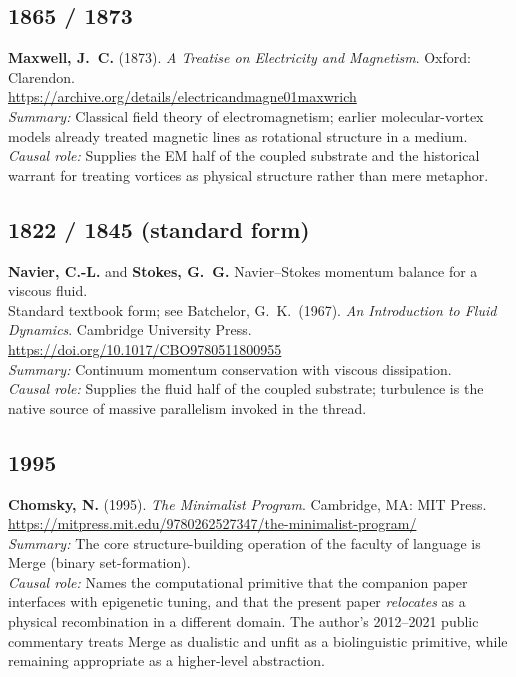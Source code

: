 \documentclass[11pt,a4paper]{article}
\begin{document}
\subsection*{1865 / 1873}
\textbf{Maxwell, J.~C.} (1873). \textit{A Treatise on Electricity and Magnetism}. Oxford: Clarendon.  \\
\url{https://archive.org/details/electricandmagne01maxwrich}\\
\textit{Summary:} Classical field theory of electromagnetism; earlier molecular-vortex models already treated magnetic lines as rotational structure in a medium.\\
\textit{Causal role:} Supplies the EM half of the coupled substrate and the historical warrant for treating vortices as physical structure rather than mere metaphor.

\subsection*{1822 / 1845 (standard form)}
\textbf{Navier, C.-L.} and \textbf{Stokes, G.~G.} Navier--Stokes momentum balance for a viscous fluid.  \\
Standard textbook form; see Batchelor, G.~K.\ (1967). \textit{An Introduction to Fluid Dynamics}. Cambridge University Press.  \\
\url{https://doi.org/10.1017/CBO9780511800955}\\
\textit{Summary:} Continuum momentum conservation with viscous dissipation.\\
\textit{Causal role:} Supplies the fluid half of the coupled substrate; turbulence is the native source of massive parallelism invoked in the thread.

\subsection*{1995}
\textbf{Chomsky, N.} (1995). \textit{The Minimalist Program}. Cambridge, MA: MIT Press.  \\
\url{https://mitpress.mit.edu/9780262527347/the-minimalist-program/}\\
\textit{Summary:} The core structure-building operation of the faculty of language is Merge (binary set-formation).\\
\textit{Causal role:} Names the computational primitive that the companion paper interfaces with epigenetic tuning, and that the present paper \emph{relocates} as a physical recombination in a different domain. The author's 2012--2021 public commentary treats Merge as dualistic and unfit as a biolinguistic primitive, while remaining appropriate as a higher-level abstraction.
\end{document}

